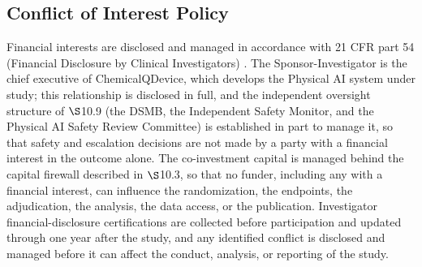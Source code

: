 \subsection{\hspace{0.03cm} Conflict of Interest Policy}

Financial interests are disclosed and managed in accordance with 21 CFR part 54
(Financial Disclosure by Clinical Investigators) \cite{ecfr2026part54}. The
Sponsor-Investigator is the chief executive of ChemicalQDevice, which develops the
Physical AI system under study; this relationship is disclosed in full, and the
independent oversight structure of $\S$10.9 (the DSMB, the Independent Safety
Monitor, and the Physical AI Safety Review Committee) is established in part to
manage it, so that safety and escalation decisions are not made by a party with a
financial interest in the outcome alone. The co-investment capital is managed behind
the capital firewall described in $\S$10.3, so that no funder, including any with a
financial interest, can influence the randomization, the endpoints, the
adjudication, the analysis, the data access, or the publication. Investigator
financial-disclosure certifications are collected before participation and updated
through one year after the study, and any identified conflict is disclosed and
managed before it can affect the conduct, analysis, or reporting of the study.

